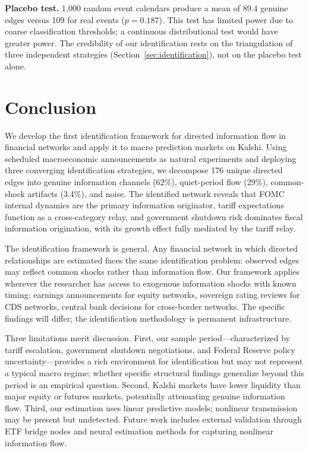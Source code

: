 \documentclass[12pt,letterpaper]{article}
\begin{document}
\textbf{Placebo test.} 1,000 random event calendars produce a mean of 89.4 genuine edges versus 109 for real events ($p=0.187$). This test has limited power due to coarse classification thresholds; a continuous distributional test would have greater power. The credibility of our identification rests on the triangulation of three independent strategies (Section~\ref{sec:identification}), not on the placebo test alone.


\section{Conclusion}\label{sec:conclusion}

We develop the first identification framework for directed information flow in financial networks and apply it to macro prediction markets on Kalshi. Using scheduled macroeconomic announcements as natural experiments and deploying three converging identification strategies, we decompose 176 unique directed edges into genuine information channels (62\%), quiet-period flow (29\%), common-shock artifacts (3.4\%), and noise. The identified network reveals that FOMC internal dynamics are the primary information originator, tariff expectations function as a cross-category relay, and government shutdown risk dominates fiscal information origination, with its growth effect fully mediated by the tariff relay.

The identification framework is general. Any financial network in which directed relationships are estimated faces the same identification problem: observed edges may reflect common shocks rather than information flow. Our framework applies wherever the researcher has access to exogenous information shocks with known timing: earnings announcements for equity networks, sovereign rating reviews for CDS networks, central bank decisions for cross-border networks. The specific findings will differ; the identification methodology is permanent infrastructure.

Three limitations merit discussion. First, our sample period---characterized by tariff escalation, government shutdown negotiations, and Federal Reserve policy uncertainty---provides a rich environment for identification but may not represent a typical macro regime; whether specific structural findings generalize beyond this period is an empirical question. Second, Kalshi markets have lower liquidity than major equity or futures markets, potentially attenuating genuine information flow. Third, our estimation uses linear predictive models; nonlinear transmission may be present but undetected. Future work includes external validation through ETF bridge nodes and neural estimation methods for capturing nonlinear information flow.
\end{document}
